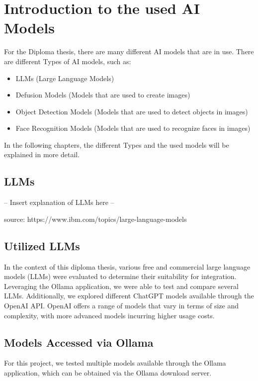 \chapter{Introduction to the used AI Models}
\label{cha:Introduction_to_the_used_AI_Models}

For the Diploma thesis, there are many different AI models that are in use. There are different Types of AI models, such as:
\begin{itemize}
    \item LLMs (Large Language Models)
    \item Defusion Models (Models that are used to create images)
    \item Object Detection Models (Models that are used to detect objects in images)
    \item Face Recognition Models (Models that are used to recognize faces in images)
\end{itemize}

In the following chapters, the different Types and the used models will be explained in more detail.

\section{LLMs}

-- Insert explanation of LLMs here --

source: https://www.ibm.com/topics/large-language-models

\section{Utilized LLMs}

In the context of this diploma thesis, various free and commercial large language models (LLMs) 
were evaluated to determine their suitability for integration. Leveraging the Ollama application, 
we were able to test and compare several LLMs. Additionally, we explored different ChatGPT models available through the OpenAI API.
OpenAI offers a range of models that vary in terms of size and complexity, with more advanced models incurring higher usage costs.

\cite{OpenAI_API_overview}

\section{Models Accessed via Ollama}

For this project, we tested multiple models available through the Ollama application, 
which can be obtained via the Ollama download server.

